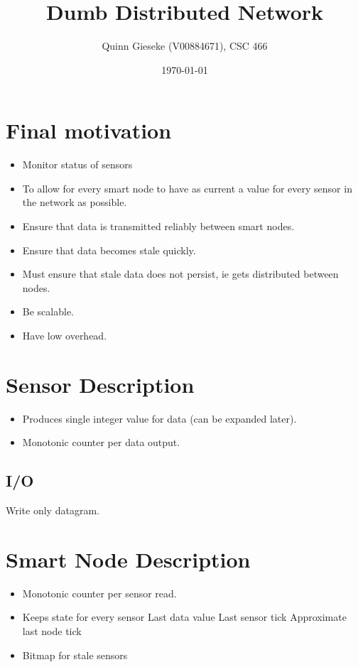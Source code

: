 \documentclass{article}
\begin{document}
\title{Dumb Distributed Network}

\author{Quinn Gieseke (V00884671), CSC 466}

\date{\today}

\maketitle
\newpage

\section{Final motivation}
\begin{itemize}
	\item Monitor status of sensors
	\item To allow for every smart node to have as current a value for every sensor in the network as possible.
	\item Ensure that data is transmitted reliably between smart nodes.
	\item Ensure that data becomes stale quickly.
	\item Must ensure that stale data does not persist, ie gets distributed between nodes.
	\item Be scalable.
	\item Have low overhead.
\end{itemize}

\newpage

\section{Sensor Description}
\begin{itemize}
	\item Produces single integer value for data (can be expanded later).
	\item Monotonic counter per data output.
\end{itemize}

\subsection{I/O}
	Write only datagram.

\newpage

\section{Smart Node Description}
\begin{itemize}
	\item Monotonic counter per sensor read.
	\item Keeps state for every sensor 
		\subitem Last data value 
		\subitem Last sensor tick 
		\subitem Approximate last node tick
	\item Bitmap for stale sensors
\end{itemize}
\end{document}
